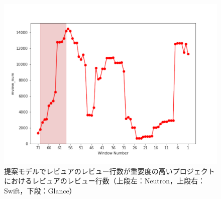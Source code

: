 \documentclass[submit]{ipsj}
\begin{document}
\begin{figure}[t]
\begin{minipage}[b]{0.65\columnwidth}
    \includegraphics[width=1\columnwidth]{Uenaka_fig/RQ2_kousatu/Glance_review_num.pdf}
\end{minipage}
    \caption{提案モデルでレビュアのレビュー行数が重要度の高いプロジェクトにおけるレビュアのレビュー行数（上段左：Neutron，上段右：Swift，下段：Glance）}
    \label{fig:review_review_num}
\end{figure}


\end{document}
